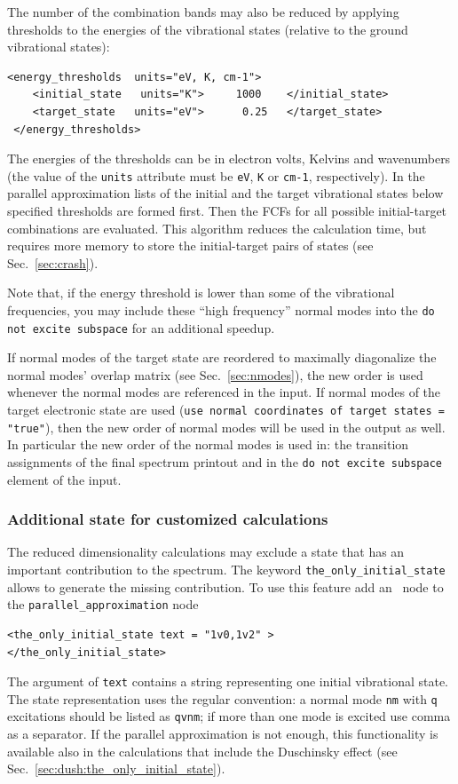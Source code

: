 \documentclass[11pt]{article}
\begin{document}
The number of the combination bands  may also be reduced by applying 
thresholds to the energies of the vibrational states 
(relative to the ground vibrational states):
\begin{lstlisting}[frame=single,framerule=0pt]
 <energy_thresholds  units="eV, K, cm-1">
    <initial_state   units="K">     1000    </initial_state>
    <target_state   units="eV">      0.25   </target_state>
 </energy_thresholds>
\end{lstlisting}
The energies of the thresholds can be in electron volts, Kelvins and wavenumbers 
(the value of the {\tt units} attribute must be {\tt eV}, {\tt K} or {\tt cm-1}, respectively).
In the parallel approximation lists of the initial and the target vibrational states below 
specified thresholds are formed first. 
Then the FCFs for all possible initial-target combinations are evaluated.
This algorithm reduces the calculation time, but requires more memory to store
the initial-target pairs of states (see Sec.~\ref{sec:crash}).

Note that, if the energy threshold is lower than some of the vibrational frequencies, 
you may include these ``high frequency'' normal modes
into the {\tt do not excite subspace} for an additional speedup.

If normal modes of the target state are reordered 
to maximally diagonalize the normal modes' overlap matrix (see Sec.~\ref{sec:nmodes}),  
the new order is used whenever the normal modes are referenced in the input.
If normal modes of the target electronic state are used ({\tt use normal coordinates of target states = "true"}),
then the new order of normal modes will be used in the output as well.
In particular the new order of the normal modes is used in:
the transition assignments of the final spectrum printout and 
in the {\tt do not excite subspace} element of the input.

\subsubsection{Additional state for customized calculations}
\label{sec:para:subspace:single_state}
The reduced dimensionality calculations may exclude a state that has an important contribution to
the spectrum. The keyword {\tt{}the\_only\_initial\_state} allows to generate the missing contribution.
To use this feature add an \xml\ node to the {\tt{}parallel\_approximation} node 
\begin{lstlisting}[frame=single,framerule=0pt]
<the_only_initial_state text = "1v0,1v2" >
</the_only_initial_state>
\end{lstlisting}
The argument of {\tt{}text} contains a string representing one initial vibrational state. The state representation uses the regular convention: a normal mode {\tt{}nm} with {\tt{}q} excitations should be listed as {\tt{}qvnm}; if more than one mode is excited use comma as a separator. If the parallel approximation is not enough, this functionality is available also in the calculations that include the Duschinsky effect (see Sec.~\ref{sec:dush:the_only_initial_state}).
\end{document}
